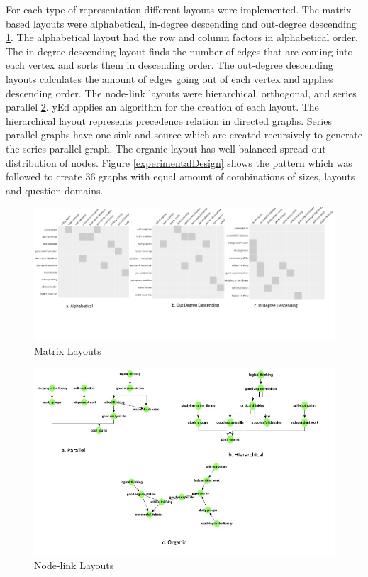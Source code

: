 \documentclass{l4proj}
\begin{document}
For each type of representation different layouts were implemented. The matrix-based layouts were alphabetical, in-degree descending and out-degree descending \ref{matrixLayout}. The alphabetical layout had the row and column factors in alphabetical order. The in-degree descending layout finds the number of edges that are coming into each vertex and sorts them in descending order. The out-degree descending layouts calculates the amount of edges going out of each vertex and applies descending order.  The node-link layouts were hierarchical, orthogonal, and series parallel \ref{nodeLayouts}. yEd applies an algorithm for the creation of each layout. The hierarchical layout represents precedence relation in directed graphs. Series parallel graphs have one sink and source which are created recursively to generate the series parallel graph. The organic layout has well-balanced spread out distribution of nodes. Figure \ref{experimentalDesign} shows the pattern which was followed to create 36 graphs with equal amount of combinations of sizes, layouts and question domains. 

\begin{figure}[h]
\centering
\includegraphics[width=18cm]{images/matrixLayout.png}
\caption{Matrix Layouts}
\label{matrixLayout}
\end{figure}

\begin{figure}[h]
\centering
\includegraphics[width=15cm]{images/nodeLayouts.png}
\caption{Node-link Layouts}
\label{nodeLayouts}
\end{figure}
\end{document}
